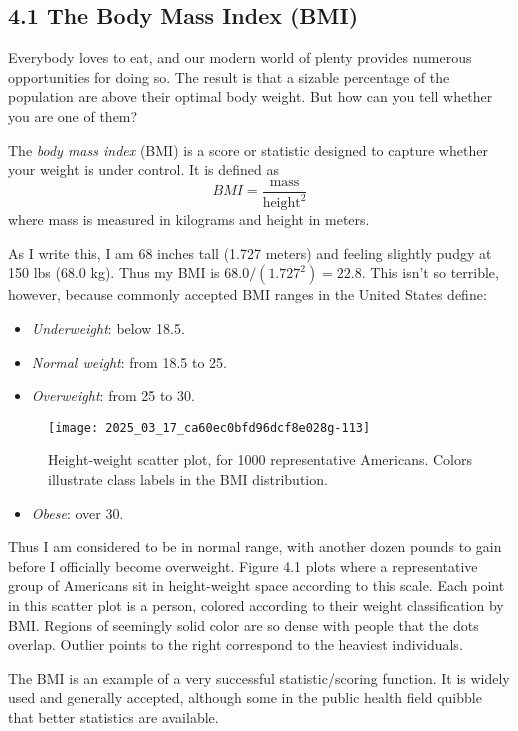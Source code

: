 \documentclass[10pt]{article}
\begin{document}
\subsection*{4.1 The Body Mass Index (BMI)}
Everybody loves to eat, and our modern world of plenty provides numerous opportunities for doing so. The result is that a sizable percentage of the population are above their optimal body weight. But how can you tell whether you are one of them?

The \textit{body mass index} (BMI) is a score or statistic designed to capture whether your weight is under control. It is defined as
\[
BMI = \frac{\text{mass}}{\text{height}^{2}}
\]
where mass is measured in kilograms and height in meters.

As I write this, I am 68 inches tall (1.727 meters) and feeling slightly pudgy at 150 lbs (68.0 kg). Thus my BMI is \(68.0 / (1.727^2) = 22.8\). This isn't so terrible, however, because commonly accepted BMI ranges in the United States define:
\begin{itemize}
  \item \textit{Underweight}: below 18.5.
  \item \textit{Normal weight}: from 18.5 to 25.
  \item \textit{Overweight}: from 25 to 30.
\end{itemize}

\begin{figure}[h]
\centering
\texttt{[image: 2025\_03\_17\_ca60ec0bfd96dcf8e028g-113]}
\caption{Height-weight scatter plot, for 1000 representative Americans. Colors illustrate class labels in the BMI distribution.}
\end{figure}

\begin{itemize}
  \item \textit{Obese}: over 30.
\end{itemize}

Thus I am considered to be in normal range, with another dozen pounds to gain before I officially become overweight. Figure 4.1 plots where a representative group of Americans sit in height-weight space according to this scale. Each point in this scatter plot is a person, colored according to their weight classification by BMI. Regions of seemingly solid color are so dense with people that the dots overlap. Outlier points to the right correspond to the heaviest individuals.

The BMI is an example of a very successful statistic/scoring function. It is widely used and generally accepted, although some in the public health field quibble that better statistics are available.
\end{document}
